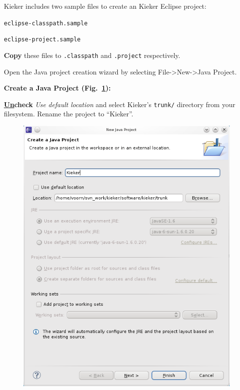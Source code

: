 \begin{compactenum}
\item Kieker includes two sample files to create an Kieker Eclipse project: %
\begin{compactitem}
\item \texttt{eclipse-classpath.sample}
\item \texttt{eclipse-project.sample} 
\end{compactitem}

\noindent \textbf{Copy} these files to \texttt{.classpath} and \texttt{.project} respectively.

\item Open the Java project creation wizard by selecting File->New->Java Project.
\begin{compactenum}
\item \textbf{Create a Java Project (Fig.~\ref{fig:eclipse:newProject}):} %

\textbf{\underline{Un}check} \textit{Use default location} and select Kieker's %
\texttt{trunk/} directory from your filesystem. Rename the project to ``Kieker''. 

\begin{figure}[H]\centering
\includegraphics[scale=0.4]{figures/eclipse-NewProject}
\caption{}
\label{fig:eclipse:newProject}
\end{figure}


\end{compactenum}
\end{compactenum}
